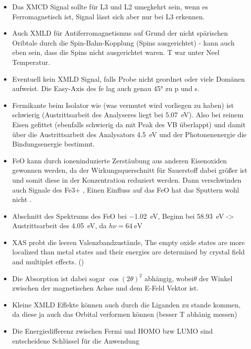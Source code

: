\begin{itemize}
            \item Das XMCD Signal sollte für L3 und L2 umegkehrt sein, wenn es Ferromagnetisch ist, Signal lässt sich aber nur bei L3 erkennen.
            \item Auch XMLD für Antiferromagnetismus auf Grund der nicht spärischen Oribtale durch die Spin-Bahn-Kopplung (Spins ausgerichtet) \cite{stohr_magnetism_2006} - kann auch eben sein, dass die Spins nicht ausgerichtet waren. T war unter Neel Temperatur.
            \item Eventuell kein XMLD Signal, falls Probe nicht geordnet oder viele Domänen aufweist. Die Easy-Axis des fe lag auch genau 45° zu p und s.
            \item Fermikante beim Isolator wie  (was vermutet wird vorliegen zu haben) ist schwierig (Austrittsarbeit des Analyseres liegt bei \SI{5.07}{\electronvolt}). Also bei reinem Eisen gefittet (ebenfalls schwierig da mit Peak des VB überlappt) und damit über die Austrittsarbeit des Analysators \SI{4.5}{\electronvolt} und der Photonenenergie die Bindungsenergie bestimmt.
            \item FeO kann durch ioneninduzierte Zerstäubung aus anderen Eisenoxiden gewonnen werden, da der Wirkungsquerschnitt für Sauerstoff dabei größer ist und somit diese in der Konzentration reduziert werden. \cite{FeO_12}
                  Dann verschwinden auch Signale des Fe3+ \cite{FeO_15}, Einen Einfluss auf das FeO hat das Sputtern wohl nicht \cite{FeO_12, FeO_15}.
            \item Abschnitt des Spektrums des FeO bei \SI{-1.02}{\electronvolt}, Beginn bei \SI{58.93}{\electronvolt} -> Austrittsarbeit des  \SI{4.05}{\electronvolt}, da $h\nu = \SI{64}{\electronvolt}$
            \item XAS probt die leeren Valenzbandzustände,  The empty oxide states are more localized than metal states and their energies are determined by crystal field and multiplet effects. (\cite{XMCD_XMLD})
            \item Die Absorption ist dabei sogar $\cos(2\theta)^2$ abhängig, wobei$\theta$ der Winkel zwischen der magnetischen Achse und dem E-Feld Vektor ist.
            \item Kleine XMLD Effekte können auch durch die Liganden zu stande kommen, da diese ja auch das Orbital verformen können (besser T abhänig messen)
            \item Die Energiedifferenz zwischen Fermi und HOMO bzw LUMO sind entscheidene Schlüssel für die Anwendung \cite{5A_4}
        \end{itemize}

